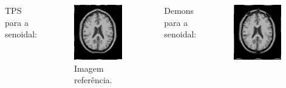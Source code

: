 \documentclass[t]{beamer}
\begin{document}
\begin{frame}
   \begin{columns}[c]
        TPS para a senoidal:
        \begin{figure}[!h]
          \begin{center}
            \includegraphics[width=0.9\textwidth]{../images/resultSin.png}
            \caption{Imagem referência.}
          \end{center}
        \end{figure}
        Demons para a senoidal:
        \begin{figure}[!h]
          \begin{center}
            \includegraphics[width=0.9\textwidth]{../images/resultSinDemon.png}

\end{center}
\end{figure}
\end{columns}
\end{frame}
\end{document}
